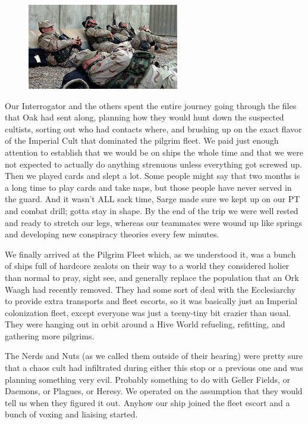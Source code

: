 \begin{figure}
	\begin{center}
		\includegraphics[width=\figwidth]{pics/2/5.png}
	\end{center}
\end{figure}
Our Interrogator and the others spent the entire journey going through the files that Oak had sent along, planning how they would hunt down the suspected cultists, sorting out who had contacts where, and brushing up on the exact flavor of the Imperial Cult that dominated the pilgrim fleet. 
We paid just enough attention to establish that we would be on ships the whole time and that we were not expected to actually do anything strenuous unless everything got screwed up. 
Then we played cards and slept a lot. 
Some people might say that two months is a long time to play cards and take naps, but those people have never served in the guard. 
And it wasn't ALL sack time, Sarge made sure we kept up on our PT and combat drill; gotta stay in shape. 
By the end of the trip we were well rested and ready to stretch our legs, whereas our teammates were wound up like springs and developing new conspiracy theories every few minutes.

We finally arrived at the Pilgrim Fleet which, as we understood it, was a bunch of ships full of hardcore zealots on their way to a world they considered holier than normal to pray, sight see, and generally replace the population that an Ork Waagh had recently removed. 
They had some sort of deal with the Ecclesiarchy to provide extra transports and fleet escorts, so it was basically just an Imperial colonization fleet, except everyone was just a teeny-tiny bit crazier than usual. 
They were hanging out in orbit around a Hive World refueling, refitting, and gathering more pilgrims. 

The Nerds and Nuts (as we called them outside of their hearing) were pretty sure that a chaos cult had infiltrated during either this stop or a previous one and was planning something very evil. 
Probably something to do with Geller Fields, or Daemons, or Plagues, or Heresy. 
We operated on the assumption that they would tell us when they figured it out. 
Anyhow our ship joined the fleet escort and a bunch of voxing and liaising started.

